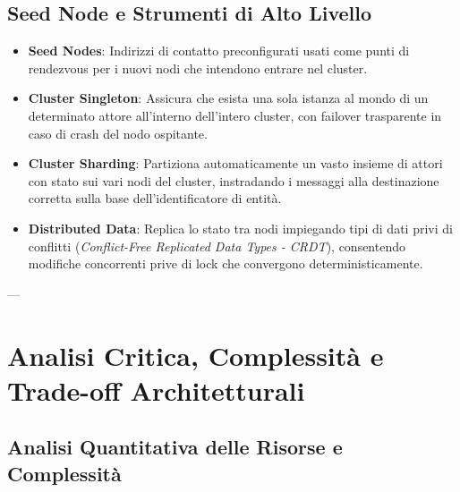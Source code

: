 \subsection{Seed Node e Strumenti di Alto Livello}
\begin{itemize}
    \item \textbf{Seed Nodes}: Indirizzi di contatto preconfigurati usati come punti di rendezvous per i nuovi nodi che intendono entrare nel cluster.
    \item \textbf{Cluster Singleton}: Assicura che esista una sola istanza al mondo di un determinato attore all'interno dell'intero cluster, con failover trasparente in caso di crash del nodo ospitante.
    \item \textbf{Cluster Sharding}: Partiziona automaticamente un vasto insieme di attori con stato sui vari nodi del cluster, instradando i messaggi alla destinazione corretta sulla base dell'identificatore di entità.
    \item \textbf{Distributed Data}: Replica lo stato tra nodi impiegando tipi di dati privi di conflitti (\textit{Conflict-Free Replicated Data Types - CRDT}), consentendo modifiche concorrenti prive di lock che convergono deterministicamente.
\end{itemize}

---

\section{Analisi Critica, Complessità e Trade-off Architetturali}

\subsection{Analisi Quantitativa delle Risorse e Complessità}

